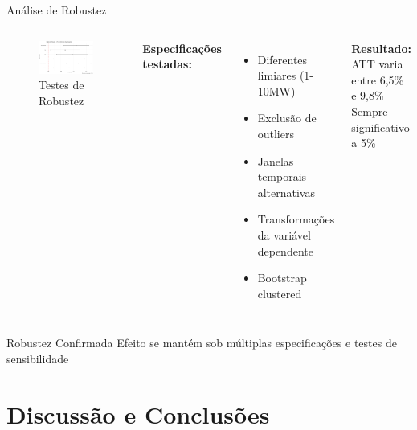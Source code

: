 \documentclass[10pt,aspectratio=169]{beamer}
\begin{document}
\begin{frame}{Análise de Robustez}
\begin{columns}
\begin{figure}
\centering
\includegraphics[width=\textwidth]{../../../data/outputs/robustness_plot.png}
\caption{Testes de Robustez}
\end{figure}

\textbf{Especificações testadas:}
\begin{itemize}
    \item Diferentes limiares (1-10MW)
    \item Exclusão de outliers
    \item Janelas temporais alternativas
    \item Transformações da variável dependente
    \item Bootstrap clustered
\end{itemize}

\textbf{Resultado:}\\
ATT varia entre 6,5\% e 9,8\%\\
Sempre significativo a 5\%
\end{columns}

\begin{alertblock}{Robustez Confirmada}
Efeito se mantém sob múltiplas especificações e testes de sensibilidade
\end{alertblock}
\end{frame}

\section{Discussão e Conclusões}
\end{document}
